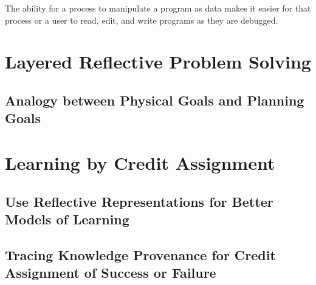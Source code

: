 The ability for a process to manipulate a program as data makes it
easier for that process or a user to read, edit, and write programs as
they are debugged.


\section{Layered Reflective Problem Solving}

\subsection{Analogy between Physical Goals and Planning Goals}


\section{Learning by Credit Assignment}

\subsection{Use Reflective Representations for Better Models of Learning}

\subsection{Tracing Knowledge Provenance for Credit Assignment of Success or Failure}



